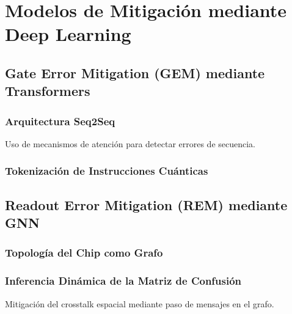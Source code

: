 \chapter{Modelos de Mitigación mediante Deep Learning}
\label{cap:ia}

\section{Gate Error Mitigation (GEM) mediante Transformers}
\subsection{Arquitectura Seq2Seq}
Uso de mecanismos de atención para detectar errores de secuencia.
\subsection{Tokenización de Instrucciones Cuánticas}

\section{Readout Error Mitigation (REM) mediante GNN}
\subsection{Topología del Chip como Grafo}
\subsection{Inferencia Dinámica de la Matriz de Confusión}
Mitigación del crosstalk espacial mediante paso de mensajes en el grafo.